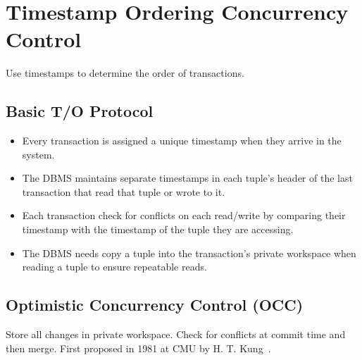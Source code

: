 \documentclass[11pt]{article}
\begin{document}
\section{Timestamp Ordering Concurrency Control}
Use timestamps to determine the order of transactions.

\subsection*{Basic T/O Protocol}
\begin{itemize}
    \item
    Every transaction is assigned a unique timestamp when they arrive in the system.
    
    \item
    The DBMS maintains separate timestamps in each tuple's header of the last transaction that read 
    that tuple or wrote to it.
    
    \item
    Each transaction check for conflicts on each read/write by comparing their timestamp with the 
    timestamp of the tuple they are accessing.
    
    \item
    The DBMS needs copy a tuple into the transaction's private workspace when reading a tuple to 
    ensure repeatable reads.
\end{itemize}

\subsection*{Optimistic Concurrency Control (OCC)}
Store all changes in private workspace.
Check for conflicts at commit time and then merge.
First proposed in 1981 at CMU by H. T. Kung~\cite{p213-kung}.
\end{document}
